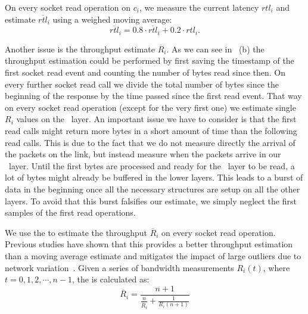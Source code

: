On every socket read operation on $c_i$, we measure the current latency 
$rtl_{i}$  and estimate $\overline{rtl}_i$ using a weighed moving average:
$$\overline{rtl}_i = 0.8 \cdot \overline{rtl}_i + 0.2\cdot rtl_{i}.$$

Another issue is the throughput estimate $\overline{R}_i$. 
As we can see in~ (b) the throughput estimation could be performed by first saving the timestamp of the first socket read event and counting the number of bytes read since then. 
On every further socket read call we divide the total number of bytes since the beginning of the response by the time passed since the first read event. 
That way on every socket read operation (except for the very first one) we estimate single $R_{i}$ values on the \mhttp~layer. 
An important issue we have to consider is that the first read calls might return more bytes in a short amount of time than the following read calls. 
This is due to the fact that we do not measure directly the arrival of the packets on the link, but instead measure when the packets arrive in our \mhttp~layer. 
Until the first bytes are processed and ready for the \mhttp~layer to be read, a lot of bytes might already be buffered in the lower layers. 
This leads to a burst of data in the beginning once all the necessary structures are setup on all the other layers. 
To avoid that this burst falsifies our estimate, we simply neglect the first samples of the first read operations. 

We use the  to estimate the throughput $\overline{R}_i$ on every socket read 
operation. Previous studies have shown that this provides a better throughput estimation
than a moving average estimate and mitigates the impact of large outliers due to 
network variation~\cite{CHEN14-MMA}. Given a series of bandwidth measurements $R_i(t)$, 
where $t=0,1,2,\cdots, n-1$, the  is calculated as:
$$\overline{R}_i = \frac{n+1}{\frac{n}{\overline{R}_i} + \frac{1}{R_i(n+1)}}$$
